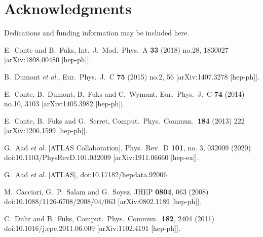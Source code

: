 \documentclass{ws-mpla}
\begin{document}
\section*{Acknowledgments}
Dedications and funding information may be included here.

\begin{thebibliography}{99}
  E.~Conte and B.~Fuks,
  Int.\ J.\ Mod.\ Phys.\ A {\bf 33} (2018) no.28,  1830027
  [arXiv:1808.00480 [hep-ph]].

  B.~Dumont {\it et al.},
  Eur.\ Phys.\ J.\ C {\bf 75} (2015) no.2,  56
  [arXiv:1407.3278 [hep-ph]].

  E.~Conte, B.~Dumont, B.~Fuks and C.~Wymant,
  Eur.\ Phys.\ J.\ C {\bf 74} (2014) no.10,  3103
  [arXiv:1405.3982 [hep-ph]].

  E.~Conte, B.~Fuks and G.~Serret,
  Comput.\ Phys.\ Commun.\  {\bf 184} (2013) 222
  [arXiv:1206.1599 [hep-ph]].

  G.~Aad {\it et al.} [ATLAS Collaboration],
  Phys.\ Rev.\ D {\bf 101}, no. 3, 032009 (2020)
  doi:10.1103/PhysRevD.101.032009
  [arXiv:1911.06660 [hep-ex]].

G.~Aad \textit{et al.} [ATLAS],
doi:10.17182/hepdata.92006

  M.~Cacciari, G.~P.~Salam and G.~Soyez,
  JHEP {\bf 0804}, 063 (2008)
  doi:10.1088/1126-6708/2008/04/063
  [arXiv:0802.1189 [hep-ph]].

  C.~Duhr and B.~Fuks,
  Comput.\ Phys.\ Commun.\  {\bf 182}, 2404 (2011)
  doi:10.1016/j.cpc.2011.06.009
  [arXiv:1102.4191 [hep-ph]].
  

\end{thebibliography}
\end{document}
